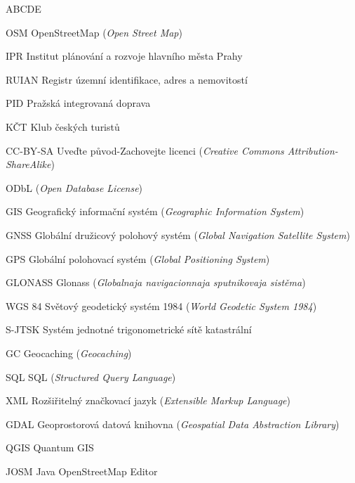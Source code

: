 \begin{seznamzkratek}{ABCDE}

		{OSM}
		{OpenStreetMap (\textit{Open Street Map})}

	    {IPR}
        {Institut plánování a rozvoje hlavního města Prahy}

	    {RUIAN}
        {Registr územní identifikace, adres a nemovitostí}

	    {PID}
        {Pražská integrovaná doprava}

	    {KČT}
        {Klub českých turistů}

		{CC-BY-SA}
		{Uveďte původ-Zachovejte licenci (\textit{Creative Commons Attribution-ShareAlike})}

		{ODbL}
		{(\textit{Open Database License})}

	      {GIS}
 	      {Geografický informační systém  (\textit{Geographic Information System})}

		{GNSS}
		{Globální družicový polohový systém (\textit{Global Navigation Satellite System})}

		{GPS}
		{Globální polohovací systém (\textit{Global Positioning System})}

		{GLONASS}
		{Glonass (\textit{Globalnaja navigacionnaja sputnikovaja sistěma})}

		{WGS 84}
		{Světový geodetický systém 1984 (\textit{World Geodetic System 1984})}

		{S-JTSK}
		{Systém jednotné trigonometrické sítě katastrální}

		{GC}
		{Geocaching (\textit{Geocaching})}

		{SQL}
		{SQL (\textit{Structured Query Language})}

		{XML}
		{Rozšiřitelný značkovací jazyk (\textit{Extensible Markup Language})}

		{GDAL}
		{Geoprostorová datová knihovna (\textit{Geospatial Data Abstraction Library})}

        {QGIS}
        {Quantum GIS}

        {JOSM}
        {Java OpenStreetMap Editor}


\end{seznamzkratek}
